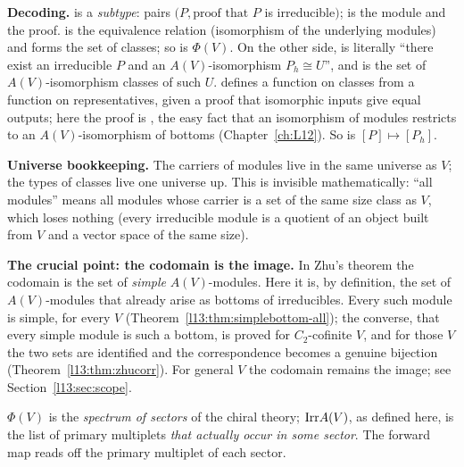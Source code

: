 \begin{dictionary}
\textbf{Decoding.}  is a \emph{subtype}: pairs $(P,\text{proof that }P$
is irreducible$)$;  is the module and  the proof.  is the equivalence
relation  (isomorphism of the underlying modules) and  forms the set of classes; so
 is $\Phi(V)$. On the other side,  is literally ``there exist an
irreducible $P$ and an $A(V)$-isomorphism $P_h\cong U$'', and  is the set of $A(V)$-isomorphism
classes of such $U$.  defines a function on classes from a function  on representatives,
given a proof  that isomorphic inputs give equal outputs; here the proof is , the
easy fact that an isomorphism of modules restricts to an $A(V)$-isomorphism of bottoms (Chapter~\ref{ch:L12}). So
 is $[P]\mapsto[P_h]$.

\textbf{Universe bookkeeping.} The carriers of modules live in the same universe  as $V$; the types of
classes live one universe up. This is invisible mathematically: ``all modules'' means all modules whose carrier is a
set of the same size class as $V$, which loses nothing (every irreducible module is a quotient of an object built from
$V$ and a vector space of the same size).

\textbf{The crucial point: the codomain is the image.} In Zhu's theorem the codomain is the set of
\emph{simple} $A(V)$-modules. Here it is, by definition, the set of $A(V)$-modules that already arise as bottoms of
irreducibles. Every such module is simple, for every $V$ (Theorem~\ref{l13:thm:simplebottom-all}); the converse, that every
simple module is such a bottom, is proved for $C_2$-cofinite $V$, and for those $V$ the two sets are identified and the
correspondence becomes a genuine bijection (Theorem~\ref{l13:thm:zhucorr}). For general $V$ the codomain remains the image;
see Section~\ref{l13:sec:scope}.
\end{dictionary}

\begin{physics}
$\Phi(V)$ is the \emph{spectrum of sectors} of the chiral theory; $\mathrm{Irr} A(V)$, as defined here, is the list of
primary multiplets \emph{that actually occur in some sector}. The forward map reads off the primary multiplet of each
sector.
\end{physics}

